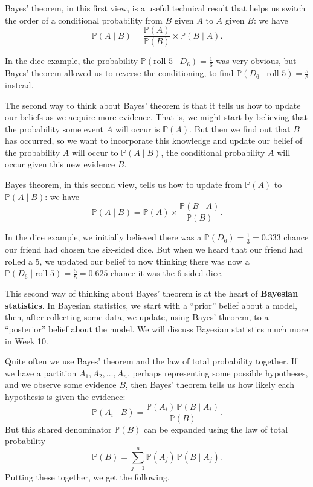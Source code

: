 \documentclass[
  a4paper,
]{book}
\theoremstyle{definition}
\theoremstyle{definition}
\theoremstyle{definition}
\theoremstyle{definition}
\theoremstyle{remark}
\begin{document}
Bayes' theorem, in this first view, is a useful technical result that helps us switch the order of a conditional probability from \(B\) given \(A\) to \(A\) given \(B\): we have
\[ \mathbb P(A \mid B) = \frac{\mathbb P(A)}{\mathbb P(B)} \times \mathbb P(B \mid A) .  \]

In the dice example, the probability \(\mathbb P(\text{roll 5} \mid D_6) = \frac16\) was very obvious, but Bayes' theorem allowed us to reverse the conditioning, to find \(\mathbb P(D_6 \mid \text{roll 5}) = \frac58\) instead.

The second way to think about Bayes' theorem is that it tells us how to update our beliefs as we acquire more evidence. That is, we might start by believing that the probability some event \(A\) will occur is \(\mathbb P(A)\). But then we find out that \(B\) has occurred, so we want to incorporate this knowledge and update our belief of the probability \(A\) will occur to \(\mathbb P(A \mid B)\), the conditional probability \(A\) will occur given this new evidence \(B\).

Bayes theorem, in this second view, tells us how to update from \(\mathbb P(A)\) to \(\mathbb P(A \mid B)\): we have
\[ \mathbb P(A \mid B) = \mathbb P(A) \times \frac{\mathbb P(B \mid A)}{\mathbb P(B)} .  \]

In the dice example, we initially believed there was a \(\mathbb P(D_6) = \frac13 = 0.333\) chance our friend had chosen the six-sided dice. But when we heard that our friend had rolled a 5, we updated our belief to now thinking there was now a \(\mathbb P(D_6 \mid \text{roll 5}) =\frac58 = 0.625\) chance it was the 6-sided dice.

This second way of thinking about Bayes' theorem is at the heart of \textbf{Bayesian statistics}. In Bayesian statistics, we start with a ``prior'' belief about a model, then, after collecting some data, we update, using Bayes' theorem, to a ``posterior'' belief about the model. We will discuss Bayesian statistics much more in Week 10.

Quite often we use Bayes' theorem and the law of total probability together. If we have a partition \(A_1, A_2, \dots, A_n\), perhaps representing some possible hypotheses, and we observe some evidence \(B\), then Bayes' theorem tells us how likely each hypothesis is given the evidence:
\[ \mathbb P(A_i \mid B) = \frac{\mathbb P(A_i) \,\mathbb P(B \mid A_i)}{\mathbb P(B)} .  \]
But this shared denominator \(\mathbb P(B)\) can be expanded using the law of total probability
\[ \mathbb P(B) = \sum_{j=1}^n \mathbb P(A_j) \,\mathbb P(B \mid A_j) . \]
Putting these together, we get the following.
\end{document}
